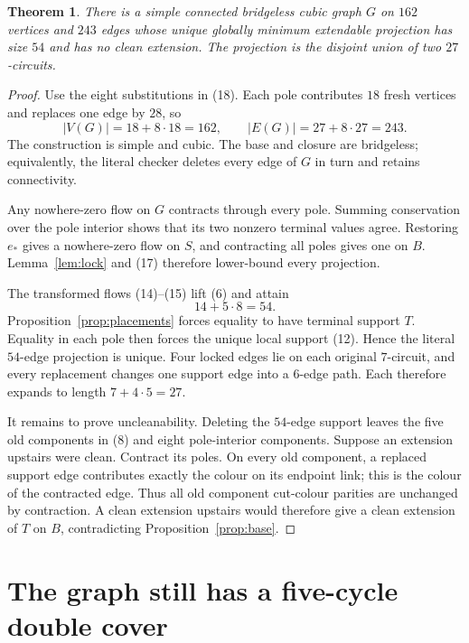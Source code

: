\documentclass[11pt]{article}
\newtheorem{theorem}{Theorem}[section]
\theoremstyle{definition}
\theoremstyle{remark}
\begin{document}
\begin{theorem}\label{thm:main}
There is a simple connected bridgeless cubic graph \(G\) on \(162\)
vertices and \(243\) edges whose unique globally minimum extendable
projection has size \(54\) and has no clean extension.  The projection
is the disjoint union of two \(27\)-circuits.
\end{theorem}

\begin{proof}
Use the eight substitutions in (18).  Each pole contributes \(18\)
fresh vertices and replaces one edge by \(28\), so
\[
 |V(G)|=18+8\cdot18=162,\qquad
 |E(G)|=27+8\cdot27=243.                                 \tag{19}
\]
The construction is simple and cubic.  The base and closure are
bridgeless; equivalently, the literal checker deletes every edge of
\(G\) in turn and retains connectivity.

Any nowhere-zero flow on \(G\) contracts through every pole.  Summing
conservation over the pole interior shows that its two nonzero terminal
values agree.  Restoring \(e_*\) gives a nowhere-zero flow on \(S\),
and contracting all poles gives one on \(B\).  Lemma~\ref{lem:lock}
and (17) therefore lower-bound every projection.

The transformed flows (14)--(15) lift (6) and attain
\[
                             14+5\cdot8=54.
\]
Proposition~\ref{prop:placements} forces equality to have terminal
support \(T\).  Equality in each pole then forces the unique local
support (12).  Hence the literal \(54\)-edge projection is unique.
Four locked edges lie on each original \(7\)-circuit, and every
replacement changes one support edge into a \(6\)-edge path.  Each
therefore expands to length \(7+4\cdot5=27\).

It remains to prove uncleanability.  Deleting the \(54\)-edge support
leaves the five old components in (8) and eight pole-interior
components.  Suppose an extension upstairs were clean.  Contract its
poles.  On every old component, a replaced support edge contributes
exactly the colour on its endpoint link; this is the colour of the
contracted edge.  Thus all old component cut-colour parities are
unchanged by contraction.  A clean extension upstairs would therefore
give a clean extension of \(T\) on \(B\), contradicting
Proposition~\ref{prop:base}.
\end{proof}

\section{The graph still has a five-cycle double cover}
\end{document}
